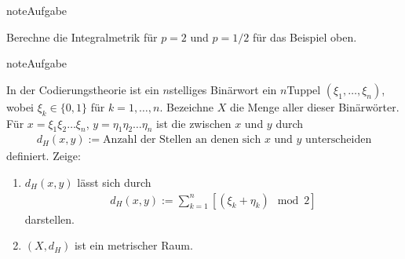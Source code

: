 \documentclass[letterpaper,10pt,english]{jupyterBook}
\begin{document}
\begin{sphinxVerbatim}[commandchars=\\\{\}]
 
 
 
\end{sphinxVerbatim}

\noindent{}

\begin{sphinxadmonition}{note}{Aufgabe}

Berechne die Integralmetrik für \(p=2\) und \(p=1/2\) für das Beispiel oben.
\end{sphinxadmonition}

\begin{sphinxadmonition}{note}{Aufgabe}

In der Codierungstheorie ist ein \(n\)\sphinxhyphen{}stelliges Binärwort ein \(n\)\sphinxhyphen{}Tuppel \((\xi_1, \ldots, \xi_n)\), wobei \(\xi_k \in \{0,1\}\) für \(k=1,\ldots, n\). Bezeichne \(X\) die Menge aller dieser Binärwörter. Für \(x = \xi_1 \xi_2 \ldots \xi_n\), \(y = \eta_1 \eta_2 \ldots \eta_n\) ist die  zwischen \(x\) und \(y\) durch
\begin{equation*}
\begin{split}d_H(x,y) := \text{Anzahl der Stellen an denen sich $x$ und $y$ unterscheiden}\end{split}
\end{equation*}
definiert. Zeige:
\begin{enumerate}
%
\item {} 
\(d_H(x,y)\) lässt sich durch
\begin{equation*}
\begin{split}d_H(x,y) := \sum_{k=1}^n [(\xi_k+\eta_k) \mod 2]\end{split}
\end{equation*}
darstellen.

\item {} 
\((X,d_H)\) ist ein metrischer Raum.

\end{enumerate}
\end{sphinxadmonition}
\end{document}
